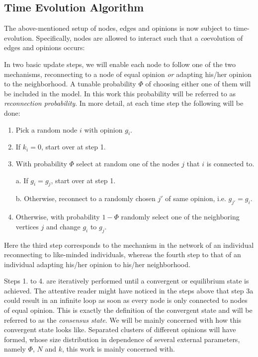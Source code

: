 \documentclass[11pt]{article}
\begin{document}
\subsection{Time Evolution Algorithm}
\label{Sec:TimeEvol}

The above-mentioned setup of nodes, edges and opinions is now subject to time-evolution. Specifically, nodes are allowed to interact such that a \textit{co}evolution of edges and opinions occurs: 

In two basic update steps, we will enable each node to follow one of the two mechanisms, reconnecting to a node of equal opinion \textit{or} adapting his/her opinion to the neighborhood. A tunable probability $\Phi$ of choosing either one of them will be included in the model. In this work this probability will be referred to as \textit{reconnection probability}. In more detail, at each time step the following will be done:

\begin{enumerate}
\item Pick a random node $i$ with opinion $g_i$. 
\item If $k_i=0$, start over at step 1. 
\item With probability $\Phi$ select at random one of the nodes $j$ that $i$ is connected to.

a. If $g_i = g_j$, start over at step 1.

b. Otherwise, reconnect to a randomly chosen $j'$ of same opinion, i.e. $g_{j'} = g_i$.

\item Otherwise, with probability $1-\Phi$ randomly select one of the neighboring vertices $j$ and change $g_i$ to $g_j$.
\end{enumerate}

Here the third step corresponds to the mechanism in the network of an individual reconnecting to like-minded individuals, whereas the fourth step to that of an individual adapting his/her opinion to his/her neighborhood. 

Steps 1. to 4. are iteratively performed until a convergent or equilibrium state is achieved. The attentive reader might have noticed in the steps above that step 3a could result in an infinite loop as soon as every node is only connected to nodes of equal opinion. This is exactly the definition of the convergent state and will be referred to as the \textit{consensus state}. We will be mainly concerned with how this convergent state looks like. Separated clusters of different opinions will have formed, whose size distribution in dependence of several external parameters, namely $\Phi$, $N$ and $k$, this work is mainly concerned with.\\
\end{document}
